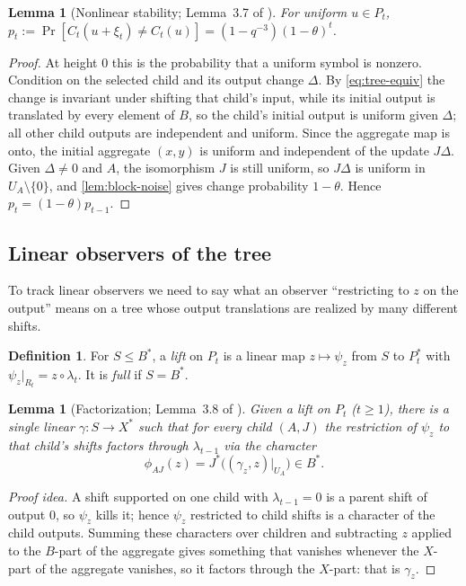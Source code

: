 \documentclass[11pt]{article}
\newtheorem{lemma}[theorem]{Lemma}
\theoremstyle{definition}
\newtheorem{definition}[theorem]{Definition}
\theoremstyle{remark}
\begin{document}
\begin{lemma}[Nonlinear stability; Lemma~3.7 of \cite{OpenAI-UGC}]\label{lem:tree-noise}
For uniform $u\in P_t$,
$p_t:=\Pr[C_t(u+\xi_t)\ne C_t(u)]=(1-q^{-3})(1-\theta)^t$.
\end{lemma}

\begin{proof}
At height $0$ this is the probability that a uniform symbol is nonzero.
Condition on the selected child and its output change $\Delta$. By
\eqref{eq:tree-equiv} the change is invariant under shifting that child's
input, while its initial output is translated by every element of $B$, so the
child's initial output is uniform given $\Delta$; all other child outputs are
independent and uniform. Since the aggregate map is onto, the initial aggregate
$(x,y)$ is uniform and independent of the update $J\Delta$. Given $\Delta\ne0$
and $A$, the isomorphism $J$ is still uniform, so $J\Delta$ is uniform in
$U_A\setminus\{0\}$, and \cref{lem:block-noise} gives change probability
$1-\theta$. Hence $p_t=(1-\theta)p_{t-1}$.
\end{proof}

\subsection{Linear observers of the tree}\label{sec:lifts}

To track linear observers we need to say what an observer ``restricting to
$z$ on the output'' means on a tree whose output translations are realized by
many different shifts.

\begin{definition}
For $S\le B^*$, a \emph{lift} on $P_t$ is a linear map $z\mapsto\psi_z$ from
$S$ to $P_t^*$ with $\psi_z|_{R_t}=z\circ\lambda_t$. It is \emph{full} if
$S=B^*$.
\end{definition}

\begin{lemma}[Factorization; Lemma~3.8 of \cite{OpenAI-UGC}]\label{lem:factor}
Given a lift on $P_t$ ($t\ge1$), there is a single linear
$\gamma\colon S\to X^*$ such that for every child $(A,J)$ the restriction of
$\psi_z$ to that child's shifts factors through $\lambda_{t-1}$ via the
character
\[
\phi_{AJ}(z)=J^*\bigl((\gamma_z,z)|_{U_A}\bigr)\in B^*.
\]
\end{lemma}

\begin{proof}[Proof idea]
A shift supported on one child with $\lambda_{t-1}=0$ is a parent shift of
output $0$, so $\psi_z$ kills it; hence $\psi_z$ restricted to child shifts
is a character of the child outputs. Summing these characters over children and
subtracting $z$ applied to the $B$-part of the aggregate gives something that
vanishes whenever the $X$-part of the aggregate vanishes, so it factors through
the $X$-part: that is $\gamma_z$.
\end{proof}
\end{document}
